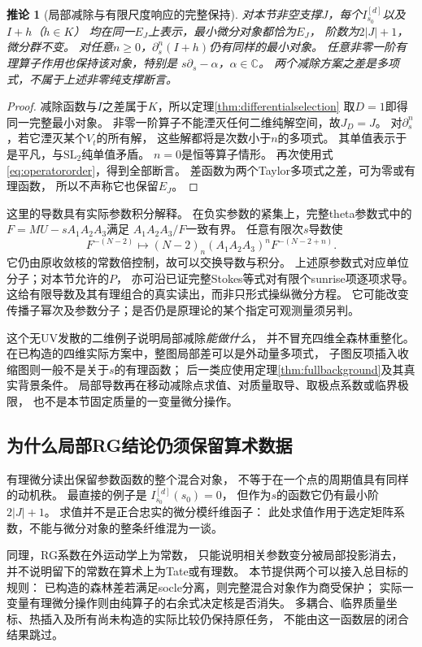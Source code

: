 \documentclass[11pt,a4paper]{ctexart}
\theoremstyle{cnplain}\newtheorem{theorem}{定理}[section]
\newtheorem{corollary}[theorem]{推论}
\theoremstyle{definition}\newtheorem{definition}[theorem]{定义}
\theoremstyle{remark}\newtheorem{remark}[theorem]{注}
\begin{document}
\begin{corollary}[局部减除与有限尺度响应的完整保持]\label{cor:jetstability}
对本节非空支撑$J$，每个$I^{[d]}_{s_0}$以及$I+h$（$h\in K$）
均在同一$E_J$上表示，最小微分对象都恰为$E_J$，
阶数为$2|J|+1$，微分群不变。
对任意$n\ge0$，$\partial_s^n(I+h)$仍有同样的最小对象。
任意非零一阶有理算子作用也保持该对象，特别是
$s\partial_s-\alpha$，$\alpha\in\mathbb C$。
两个减除方案之\emph{差}是多项式，不属于上述非零纯支撑断言。
\end{corollary}
\begin{proof}
减除函数与$I$之差属于$K$，所以定理\ref{thm:differentialselection}
取$D=1$即得同一完整最小对象。
非零一阶算子不能湮灭任何二维纯解空间，故$J_D=J$。
对$\partial_s^n$，若它湮灭某个$V_t$的所有解，
这些解都将是次数小于$n$的多项式。
其单值表示于是平凡，与$\mathrm{SL}_2$纯单值矛盾。
$n=0$是恒等算子情形。
再次使用式\eqref{eq:operatororder}，得到全部断言。
差函数为两个Taylor多项式之差，可为零或有理函数，
所以不声称它也保留$E_J$。
\end{proof}

这里的导数具有实际参数积分解释。
在负实参数的紧集上，完整theta参数式中的
$F=M U-sA_1A_2A_3$满足
$A_1A_2A_3/F$一致有界。
任意有限次$s$导数使
\[
 F^{-(N-2)}
 \longmapsto (N-2)_n
       (A_1A_2A_3)^n F^{-(N-2+n)} .
\]
它仍由原收敛核的常数倍控制，故可以交换导数与积分。
上述原参数式对应单位分子；对本节允许的$P$，
亦可沿已证完整Stokes等式对有限个sunrise项逐项求导。
这给有限导数及其有理组合的真实读出，而非只形式操纵微分方程。
它可能改变传播子幂次及参数分子；是否仍是原理论的某个指定可观测量须另判。

这个无UV发散的二维例子说明局部减除\emph{能做什么}，
并不冒充四维全森林重整化。
在已构造的四维实际方案中，整图局部差可以是外动量多项式，
子图反项插入收缩图则一般不是关于$s$的有理函数；
后一类应使用定理\ref{thm:fullbackground}及其真实背景条件。
局部导数再在移动减除点求值、对质量取导、取极点系数或临界极限，
也不是本节固定质量的一变量微分操作。

\subsection{为什么局部RG结论仍须保留算术数据}
有理微分读出保留参数函数的整个混合对象，
不等于在一个点的周期值具有同样的动机秩。
最直接的例子是
$I^{[d]}_{s_0}(s_0)=0$，
但作为$s$的函数它仍有最小阶$2|J|+1$。
求值并不是正合忠实的微分模纤维函子：
此处求值作用于选定矩阵系数，不能与微分对象的整条纤维混为一谈。

同理，RG系数在外运动学上为常数，
只能说明相关参数变分被局部投影消去，
并不说明留下的常数在算术上为Tate或有理数。
本节提供两个可以接入总目标的规则：
已构造的森林差若满足socle分离，则完整混合对象作为商受保护；
实际一变量有理微分操作则由纯算子的右余式决定核是否消失。
多耦合、临界质量坐标、热插入及所有尚未构造的实际比较仍保持原任务，
不能由这一函数层的闭合结果跳过。
\end{document}
